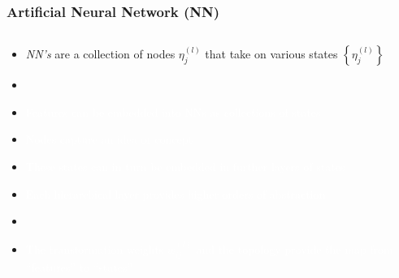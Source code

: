 \documentclass[xcolor={dvipsnames}]{beamer}
\begin{document}
\frame
{
 \frametitle{Artificial Neural Network (NN)}

\vspace{-1.62em}
\begin{columns}
\begin{column}{.6\textwidth}
\begin{itemize}
\item  \emph{NN's} are a collection of nodes $\eta^{(l)}_j$ that take on various states $\left\{\eta^{(l)}_j\right\}$
\item[]
\item[] \textcolor{white}{Features can be embedded into NNs as collections of states  }
\item[] \textcolor{white}{Nodes capture an idea or concept}
\item[] \textcolor{white}{These states can in turn be embedded in further layers of states}
\item[] \textcolor{white}{Each hierarchical layer provides higher orders of abstraction}
\item[]
\item[] \textcolor{white}{The transformation weights $w^{(l)}_{ij}$ and the topology provide the map from ``features'' to  ``states''}
\end{itemize}
\end{column}
\begin{column}{.5\textwidth}
\vspace{1.75em}


\end{column}
\end{columns}

}
\end{document}
